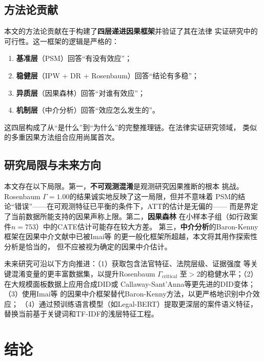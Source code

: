 \documentclass[12pt,a4paper,twoside]{ctexart}
\begin{document}
\subsection{方法论贡献}

本文的方法论贡献在于构建了\textbf{四层递进因果框架}并验证了其在法律
实证研究中的可行性。这一框架的逻辑是严格的：

\begin{enumerate}[label=\textbf{层\arabic*：},leftmargin=*]
    \item \textbf{基准层}（PSM）回答``有没有效应''；
    \item \textbf{稳健层}（IPW + DR + Rosenbaum）回答``结论有多稳''；
    \item \textbf{异质层}（因果森林）回答``对谁有效应''；
    \item \textbf{机制层}（中介分析）回答``效应怎么发生的''。
\end{enumerate}

这四层构成了从``是什么''到``为什么''的完整推理链。在法律实证研究领域，
类似的多重因果方法组合应用尚属首次。

\subsection{研究局限与未来方向}

本文存在以下局限。第一，\textbf{不可观测混淆}是观测研究因果推断的根本
挑战。Rosenbaum $\Gamma=1.00$的结果诚实地反映了这一局限，但并不意味着
PSM的结论``错误''——在可观测特征已平衡的条件下，ATT的估计是无偏的——
而是界定了当前数据所能支持的因果声称上限。第二，\textbf{因果森林}
在小样本子组（如行政案件$n=753$）中的CATE估计可能存在较大方差。
第三，\textbf{中介分析}的Baron-Kenny框架在因果中介文献中已被Imai等
\cite{imai2010}的更一般化框架所超越，本文将其用作探索性分析是恰当的，
但不应被视为确定的因果中介估计。

未来研究可沿以下方向推进：（1）获取包含法官特征、法院层级、证据强度
等关键混淆变量的更丰富数据集，以提升Rosenbaum $\Gamma_{\text{critical}}$
至$>2$的稳健水平；（2）在大规模面板数据上应用合成DID或
Callaway-Sant'Anna等更先进的DID变体；（3）使用Imai等\cite{imai2010}
的因果中介框架替代Baron-Kenny方法，以更严格地识别中介效应；
（4）通过预训练语言模型（如Legal-BERT）提取更深层的案件语义特征，
替换当前基于关键词和TF-IDF的浅层特征工程。

\section{结论}
\end{document}

